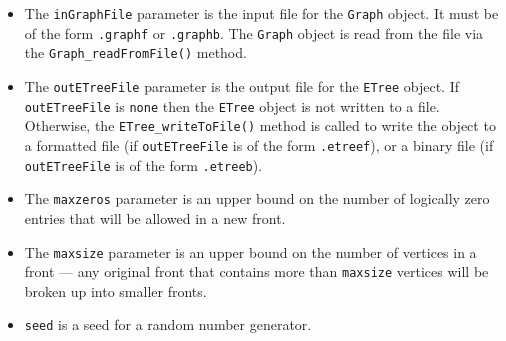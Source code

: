 \begin{enumerate}
\begin{itemize}
\item
The {\tt inGraphFile} parameter is the input file for the {\tt Graph}
object. It must be of the form {\tt *.graphf} or {\tt *.graphb}.
The {\tt Graph} object is read from the file via the
{\tt Graph\_readFromFile()} method.
\item
The {\tt outETreeFile} parameter is the output file for the {\tt ETree}
object. 
If {\tt outETreeFile} is {\tt none} then the {\tt ETree} object is not
written to a file. 
Otherwise, the {\tt ETree\_writeToFile()} method is called to write
the object to a formatted file (if {\tt outETreeFile} 
is of the form {\tt *.etreef}), or a binary file 
(if {\tt outETreeFile} is of the form {\tt *.etreeb}).
\item
The {\tt maxzeros} parameter is an upper bound on the number of
logically zero entries that will be allowed in a new front.
\item
The {\tt maxsize} parameter is an upper bound on the number of
vertices in a front --- any original front that contains more than
{\tt maxsize} vertices will be broken up into smaller fronts.
\item
{\tt seed} is a seed for a random number generator.
\end{itemize}
\end{enumerate}
